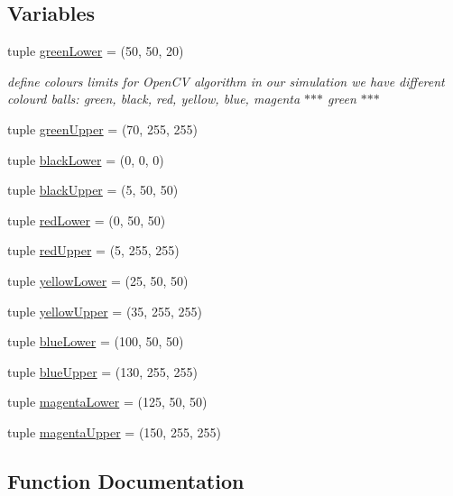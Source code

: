 \subsection*{Variables}
\begin{DoxyCompactItemize}
\item 
tuple \hyperlink{namespacestate__machine_aa0d3e8fce4b6fe8788f035c40482a6c6}{green\+Lower} = (50, 50, 20)
\begin{DoxyCompactList}\small\item\em define colours limits for Open\+CV algorithm in our simulation we have different colourd balls\+: green, black, red, yellow, blue, magenta $\ast$$\ast$$\ast$ green $\ast$$\ast$$\ast$ \end{DoxyCompactList}\item 
tuple \hyperlink{namespacestate__machine_adf0d73f9e376e0b066d4ab6127dc498b}{green\+Upper} = (70, 255, 255)
\item 
tuple \hyperlink{namespacestate__machine_ae800938b579cd16f85cdd743d58143e5}{black\+Lower} = (0, 0, 0)
\item 
tuple \hyperlink{namespacestate__machine_a07afd0b9efebc18e612ffbf6f0d729ca}{black\+Upper} = (5, 50, 50)
\item 
tuple \hyperlink{namespacestate__machine_a4905a105f2253662020e49c78e77312a}{red\+Lower} = (0, 50, 50)
\item 
tuple \hyperlink{namespacestate__machine_aa2123f5d6cb9631ca61253c0a17ce023}{red\+Upper} = (5, 255, 255)
\item 
tuple \hyperlink{namespacestate__machine_a8e2b229e1bd3bd9d87cf71403c018b70}{yellow\+Lower} = (25, 50, 50)
\item 
tuple \hyperlink{namespacestate__machine_a483ae42836541d8b86afd10162b39814}{yellow\+Upper} = (35, 255, 255)
\item 
tuple \hyperlink{namespacestate__machine_a0410a5010d534f980f7b6690b58961da}{blue\+Lower} = (100, 50, 50)
\item 
tuple \hyperlink{namespacestate__machine_acaae31790ee8ca5aedbf802044e5c489}{blue\+Upper} = (130, 255, 255)
\item 
tuple \hyperlink{namespacestate__machine_ac525748b3dd0fe5a7626ca96597c7137}{magenta\+Lower} = (125, 50, 50)
\item 
tuple \hyperlink{namespacestate__machine_aba747bf4284a6a4eb77a1935875efe95}{magenta\+Upper} = (150, 255, 255)
\end{DoxyCompactItemize}


\subsection{Function Documentation}
